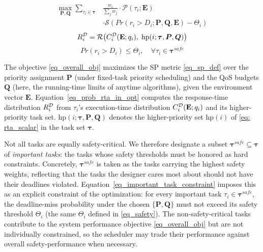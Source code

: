 	\begin{equation}
		\begin{aligned}
		\max_{\boldsymbol{P}, \boldsymbol{Q}} \sum_{\tau_i \in \boldsymbol{\tau}} & \frac{w_i}{\sum_j w_j} \cdot \mathcal{P}(\tau_i; \textbf{E}) \\
		& \cdot \mathcal{S}\!\left(Pr(r_i > D_i ; \boldsymbol{P}, \boldsymbol{Q}, \textbf{E}) - \Theta_i\right)
		\end{aligned}
		\label{eq_overall_obj}
	\end{equation}
	\begin{equation}
		R_{i}^{\mathcal{D}} = \mathcal{R}\!\left(C_{i}^{\mathcal{D}}(\textbf{E};q_i),\; \text{hp}(i;\boldsymbol{\tau},\boldsymbol{P},\boldsymbol{Q})\right)
		\label{eq_prob_rta_in_opt}
	\end{equation}
	\begin{equation}
		Pr(r_i > D_i) \leq \Theta_i, \quad \forall \tau_i \in \boldsymbol{\tau}^{safe}
		\label{eq_important_task_constraint}
	\end{equation}

        The objective \eqref{eq_overall_obj} maximizes the SP metric \eqref{eq_sp_def} over the priority assignment $\boldsymbol{P}$ (under fixed-task priority scheduling) and the QoS budgets $\boldsymbol{Q}$ (here, the running-time limits of anytime algorithms), given the environment vector $\textbf{E}$.
		Equation~\eqref{eq_prob_rta_in_opt} computes the response-time distribution $R_{i}^{\mathcal{D}}$ from $\tau_i$'s execution-time distribution $C_{i}^{\mathcal{D}}(\textbf{E};q_i)$ and its higher-priority task set.
        $\text{hp}(i;\boldsymbol{\tau},\boldsymbol{P},\boldsymbol{Q})$ denotes the higher-priority set $\text{hp}(i)$ of \eqref{eq: rta_scalar} in the task set $\boldsymbol{\tau}$.

        Not all tasks are equally safety-critical.
        We therefore designate a subset $\boldsymbol{\tau}^{safe} \subseteq \boldsymbol{\tau}$ of \emph{important tasks}: the tasks whose safety thresholds must be honored as hard constraints.
        Concretely, $\boldsymbol{\tau}^{safe}$ is taken as the tasks carrying the highest safety weights, reflecting that the tasks the designer cares most about should not have their deadlines violated.
        Equation~\eqref{eq_important_task_constraint} imposes this as an explicit constraint of the optimization: for every important task $\tau_i \in \boldsymbol{\tau}^{safe}$, the deadline-miss probability under the chosen $\{\boldsymbol{P}, \boldsymbol{Q}\}$ must not exceed its safety threshold $\Theta_i$ (the same $\Theta_i$ defined in \eqref{eq_safety}).
        The non-safety-critical tasks contribute to the system performance objective \eqref{eq_overall_obj} but are not individually constrained, so the scheduler may trade their performance against overall safety-performance when necessary.

